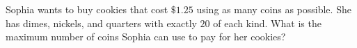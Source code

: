 Sophia wants to buy cookies that cost $\$1.25$ using as many coins as possible. She has dimes, nickels, and quarters with exactly $20$ of each kind. What is the maximum number of coins Sophia can use to pay for her cookies?
